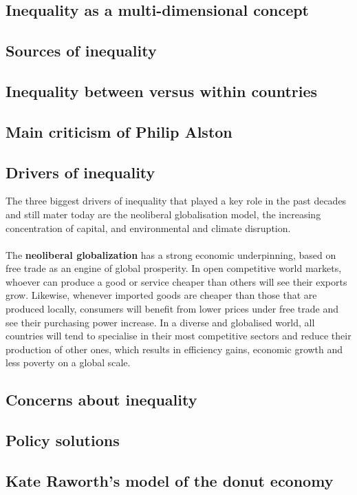 \documentclass[../summary.tex]{subfiles}
\begin{document}
	\subsection{Inequality as a multi-dimensional concept}
	
	
	
	\subsection{Sources of inequality}
	
	
	
	\subsection{Inequality between versus within countries}
	
	
	
	\subsection{Main criticism of Philip Alston}
	
	
	
	\subsection{Drivers of inequality}
	
	The three biggest drivers of inequality that played a key role in the past decades and still mater today are the neoliberal globalisation model, the increasing concentration of capital, and environmental and climate disruption.
	\\\\
	The \textbf{neoliberal globalization} has a strong economic underpinning, based on free trade as an engine of global prosperity. In open competitive world markets, whoever can produce a good or service cheaper than others will see their exports grow. Likewise, whenever imported goods are cheaper than those that are produced locally, consumers will benefit from lower prices under free trade and see their purchasing power increase. In a diverse and globalised world, all countries will tend to specialise in their most competitive sectors and reduce their production of other ones, which results in efficiency gains, economic growth and less poverty on a global scale. 
	
	\subsection{Concerns about inequality}
	
	
	
	\subsection{Policy solutions}
	
	
	
	\subsection{Kate Raworth's model of the donut economy}
\end{document}
